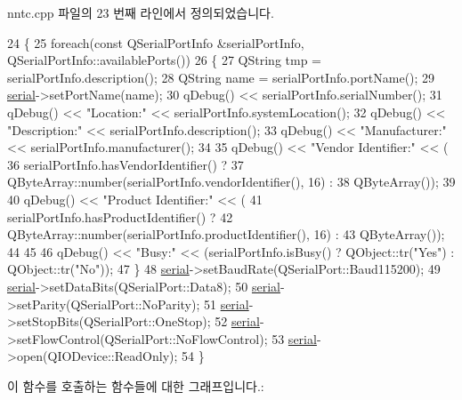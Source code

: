nntc.\+cpp 파일의 23 번째 라인에서 정의되었습니다.


\begin{DoxyCode}
24 \{
25     \textcolor{keywordflow}{foreach}(\textcolor{keyword}{const} QSerialPortInfo &serialPortInfo, QSerialPortInfo::availablePorts())
26     \{
27         QString tmp = serialPortInfo.description();
28         QString name = serialPortInfo.portName();
29         \mbox{\hyperlink{nntc_8cpp_ae6fc1d9226a3b8046c907909a550dbe7}{serial}}->setPortName(name);
30         qDebug() << serialPortInfo.serialNumber();
31         qDebug() << \textcolor{stringliteral}{"Location:"} << serialPortInfo.systemLocation();
32         qDebug() << \textcolor{stringliteral}{"Description:"} << serialPortInfo.description();
33         qDebug() << \textcolor{stringliteral}{"Manufacturer:"} << serialPortInfo.manufacturer();
34 
35         qDebug() << \textcolor{stringliteral}{"Vendor Identifier:"} << (
36             serialPortInfo.hasVendorIdentifier() ?
37             QByteArray::number(serialPortInfo.vendorIdentifier(), 16) :
38             QByteArray());
39 
40         qDebug() << \textcolor{stringliteral}{"Product Identifier:"} << (
41             serialPortInfo.hasProductIdentifier() ?
42             QByteArray::number(serialPortInfo.productIdentifier(), 16) :
43             QByteArray());
44 
45 
46         qDebug() << \textcolor{stringliteral}{"Busy:"} << (serialPortInfo.isBusy() ? QObject::tr(\textcolor{stringliteral}{"Yes"}) : QObject::tr(\textcolor{stringliteral}{"No"}));
47     \}
48     \mbox{\hyperlink{nntc_8cpp_ae6fc1d9226a3b8046c907909a550dbe7}{serial}}->setBaudRate(QSerialPort::Baud115200);
49     \mbox{\hyperlink{nntc_8cpp_ae6fc1d9226a3b8046c907909a550dbe7}{serial}}->setDataBits(QSerialPort::Data8);
50     \mbox{\hyperlink{nntc_8cpp_ae6fc1d9226a3b8046c907909a550dbe7}{serial}}->setParity(QSerialPort::NoParity);
51     \mbox{\hyperlink{nntc_8cpp_ae6fc1d9226a3b8046c907909a550dbe7}{serial}}->setStopBits(QSerialPort::OneStop);
52     \mbox{\hyperlink{nntc_8cpp_ae6fc1d9226a3b8046c907909a550dbe7}{serial}}->setFlowControl(QSerialPort::NoFlowControl);
53     \mbox{\hyperlink{nntc_8cpp_ae6fc1d9226a3b8046c907909a550dbe7}{serial}}->open(QIODevice::ReadOnly);
54 \}
\end{DoxyCode}
이 함수를 호출하는 함수들에 대한 그래프입니다.\+:
\mbox{\label{class_n_n_t_c_a2064774e2931ebb77e62bbd5115c0589}} 
